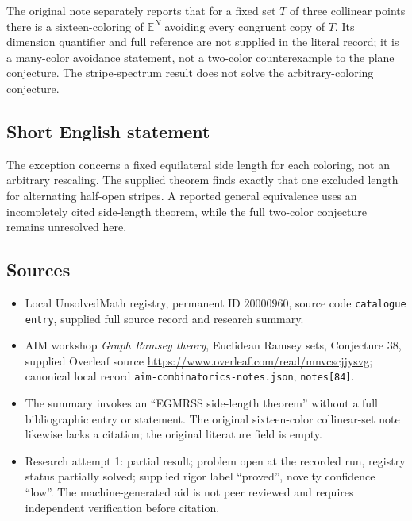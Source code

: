 \documentclass[11pt]{article}
\begin{document}
The original note separately reports that for a fixed set $T$ of three collinear points there is a sixteen-coloring of $\mathbb E^N$ avoiding every congruent copy of $T$. Its dimension quantifier and full reference are not supplied in the literal record; it is a many-color avoidance statement, not a two-color counterexample to the plane conjecture. The stripe-spectrum result does not solve the arbitrary-coloring conjecture.
\subsection{Short English statement}
The exception concerns a fixed equilateral side length for each coloring, not an arbitrary rescaling. The supplied theorem finds exactly that one excluded length for alternating half-open stripes. A reported general equivalence uses an incompletely cited side-length theorem, while the full two-color conjecture remains unresolved here.
\subsection{Sources}
\begin{itemize}
\item Local UnsolvedMath registry, permanent ID $20000960$, source code \texttt{catalogue entry}, supplied full source record and research summary.
\item AIM workshop \emph{Graph Ramsey theory}, Euclidean Ramsey sets, Conjecture 38, supplied Overleaf source \url{https://www.overleaf.com/read/mnvcscjjysvg}; canonical local record \texttt{aim-combinatorics-notes.json}, \texttt{notes[84]}.
\item The summary invokes an ``EGMRSS side-length theorem'' without a full bibliographic entry or statement. The original sixteen-color collinear-set note likewise lacks a citation; the original literature field is empty.
\item Research attempt 1: partial result; problem open at the recorded run, registry status partially solved; supplied rigor label ``proved'', novelty confidence ``low''. The machine-generated aid is not peer reviewed and requires independent verification before citation.
\end{itemize}
\end{document}
